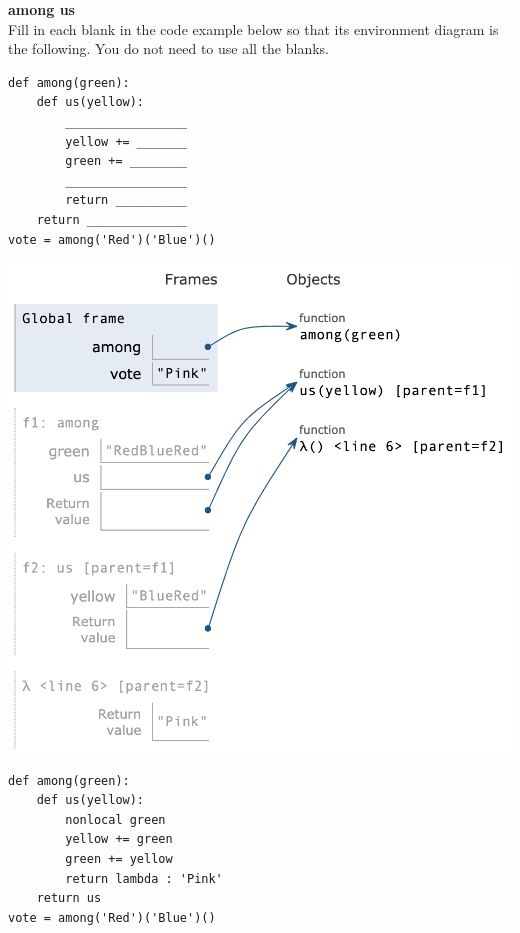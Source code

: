 \begin{blocksection}
\question
\textbf{among us}\\
Fill in each blank in the code example below so that its environment diagram is the following. You do not need to use all the blanks.

\begin{multicols}{2}
\begin{lstlisting}
def among(green):
    def us(yellow):
        _________________
        yellow += _______
        green += ________
        _________________
        return __________
    return ______________
vote = among('Red')('Blue')()
\end{lstlisting}

\columnbreak
\includegraphics[width=.45\textwidth]{amongus.png}
\end{multicols}

\begin{solution}[2in]
\begin{lstlisting}
def among(green):
    def us(yellow):
        nonlocal green
        yellow += green
        green += yellow
        return lambda : 'Pink'
    return us
vote = among('Red')('Blue')()
\end{lstlisting}
\end{solution}
\end{blocksection}
